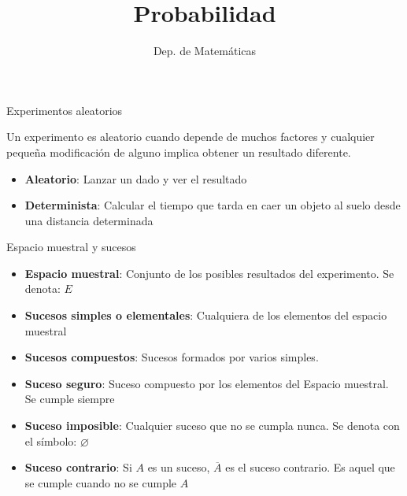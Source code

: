 \documentclass[11pt,handout]{beamer}
\title{Probabilidad}
\date{}
\author{Dep. de Matemáticas}
\begin{document}
\begin{frame}
\titlepage
\end{frame}


\begin{frame}{Experimentos aleatorios}
\begin{block}{}
Un experimento es aleatorio cuando depende de muchos factores y cualquier pequeña modificación de alguno implica obtener un resultado diferente.
\end{block}
\pause
\begin{itemize}[<+->]
 \item \textbf{Aleatorio}: Lanzar un dado y ver el resultado
 \item \textbf{Determinista}: Calcular el tiempo que tarda en caer un objeto al suelo desde una distancia determinada
 \end{itemize} 

\end{frame}



\begin{frame}{Espacio muestral y sucesos}
\begin{itemize}[<+->]
\item \textbf{Espacio muestral}: Conjunto de los posibles resultados del experimento. Se denota: $E$
\item \textbf{Sucesos simples o elementales}: Cualquiera de los elementos del espacio muestral
\item \textbf{Sucesos compuestos}: Sucesos formados por varios simples. 
\item \textbf{Suceso seguro}: Suceso compuesto por los elementos del Espacio muestral. Se cumple siempre
\item \textbf{Suceso imposible}: Cualquier suceso que no se cumpla nunca. Se denota con el símbolo: $\varnothing$
\item \textbf{Suceso contrario}: Si $A$ es un suceso, $\overline{A}$ es el suceso contrario. Es aquel que se cumple cuando no se cumple $A$
\end{itemize}

\end{frame}
\end{document}

